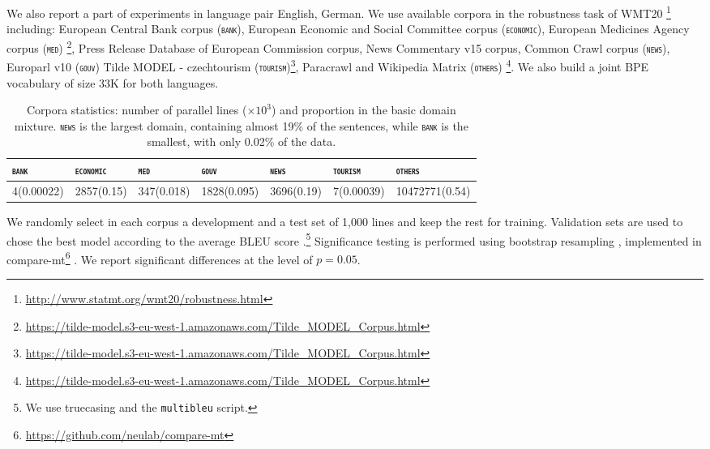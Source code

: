 \documentclass[11pt,a4paper]{article}
\newcommand{\fyDone}[1]{\done[FY]\Todo[FY:]{\textcolor{orange}{#1}}}
\newcommand{\domain}[1]{\texttt{\textsc{#1}}}
\begin{document}
We also report a part of experiments in language pair English, German. We use available corpora in the robustness task of WMT20 \footnote{\url{http://www.statmt.org/wmt20/robustness.html}} including: European Central Bank corpus (\domain{bank}),  European Economic and Social Committee corpus (\domain{economic}), European Medicines Agency corpus (\domain{med}) \footnote{\url{https://tilde-model.s3-eu-west-1.amazonaws.com/Tilde_MODEL_Corpus.html}}, Press Release Database of European Commission corpus, News Commentary v15 corpus, Common Crawl corpus (\domain{news}), Europarl v10 (\domain{gouv}) Tilde MODEL - czechtourism (\domain{tourism})\footnote{\url{https://tilde-model.s3-eu-west-1.amazonaws.com/Tilde_MODEL_Corpus.html}}, Paracrawl and Wikipedia Matrix (\domain{others}) \footnote{\url{https://tilde-model.s3-eu-west-1.amazonaws.com/Tilde_MODEL_Corpus.html}}. We also build a joint BPE vocabulary of size 33K for both languages.

\begin{table}[htbp]
  \centering
  \begin{tabular}{ |lllllll|} %
    \hline
    \domain{bank} & \domain{economic} & \domain{med} & \domain{gouv} & \domain{news} & \domain{tourism} & \domain{others} \\
    \hline
    4(0.00022) & 2857(0.15) & 347(0.018) & 1828(0.095) & 3696(0.19) & 7(0.00039) & 10472771(0.54) \\
    \hline
  \end{tabular}
\caption{Corpora statistics: number of parallel lines ($\times 10^3$) and proportion in the basic domain mixture. \domain{news} is the largest domain, containing almost 19\% of the sentences, while \domain{bank} is the smallest, with only 0.02\% of the data.}
\label{tab:Corpora-en-de}
\end{table}

We randomly select in each corpus a development and a test set of 1,000 lines and keep the rest for training. Validation sets are used to chose the best model according to the average BLEU score \cite{Papineni02bleu}.\footnote{We use truecasing and the \texttt{multibleu} script.}\fyDone{A word about meta-parameter settings} Significance testing is performed using bootstrap resampling \cite{Koehn04statistical}, implemented in compare-mt\footnote{\url{https://github.com/neulab/compare-mt}} \cite{Neubig19compare-mt}. We report significant differences at the level of $p=0.05$.\fyDone{Fix correct p value}
\end{document}

